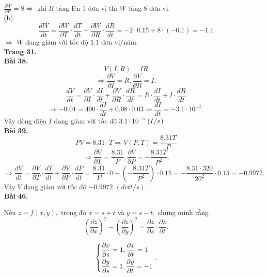 \documentclass[12pt,a4paper]{article}
\begin{document}
\(\frac{{\partial W}}{{\partial R}} = 8 \Rightarrow \) khi \(R\) tăng lên \(1\) đơn vị thì \(W\) tăng \(8\) đơn vị.\\
(b). \[\frac{{dW}}{{dt}} = \frac{{\partial W}}{{\partial T}} \cdot \frac{{dT}}{{dt}} + \frac{{\partial W}}{{\partial R}} \cdot \frac{{dR}}{{dt}} =  - 2 \cdot 0.15 + 8 \cdot \left( { - 0.1} \right) =  - 1.1\]
\( \Rightarrow \) \(W\) đang giảm với tốc độ \(1.1\) đơn vị\(/\)năm.\\
\textbf{Trang 31.}\\
\textbf{Bài 38.}
\[V\left( {I,R} \right) = IR\]
\[ \Rightarrow \frac{{\partial V}}{{\partial I}} = R,\frac{{\partial V}}{{\partial R}} = I.\]
\[\frac{{dV}}{{dt}} = \frac{{\partial V}}{{\partial I}} \cdot \frac{{dI}}{{dt}} + \frac{{\partial V}}{{\partial R}} \cdot \frac{{dR}}{{dt}} = R \cdot \frac{{dI}}{{dt}} + I \cdot \frac{{dR}}{{dt}}\]
\[ \Rightarrow  - 0.01 = 400 \cdot \frac{{dI}}{{dt}} + 0.08 \cdot 0.03 \Rightarrow \frac{{dI}}{{dt}} =  - 3.1 \cdot {10^{ - 5}}.\]
Vậy dòng điện \(I\) đang giảm với tốc độ \(3.1 \cdot {10^{ - 5}}\) \(\left( {{I \mathord{\left/
 {\vphantom {I s}} \right.
 \kern-\nulldelimiterspace} s}} \right.)\)\\
\textbf{Bài 39.} 
\[PV = 8.31 \cdot T \Rightarrow V\left( {P,T} \right) = \frac{{8.31T}}{P}\]
\[ \Rightarrow \frac{{\partial V}}{{\partial T}} = \frac{{8.31}}{P},\frac{{\partial V}}{{\partial P}} =  - \frac{{8.31T}}{{{P^2}}}.\]
\[ \Rightarrow \frac{{dV}}{{dt}} = \frac{{\partial V}}{{\partial T}} \cdot \frac{{dT}}{{dt}} + \frac{{\partial V}}{{\partial P}} \cdot \frac{{dP}}{{dt}} = \frac{{8.31}}{P} \cdot 0 + \left( { - \frac{{8.31T}}{{{P^2}}}} \right) \cdot 0.15 =  - \frac{{8.31 \cdot 320}}{{{{20}^2}}} \cdot 0.15 =  - 0.9972.\] 
Vậy \(V\) đang giảm với tốc độ \(-0.9972\) \(\left( dvtt / s \right).\)\\
\textbf{Bài 46.} 
\begin{mybox}
Nếu \(z = f\left( {x,y} \right),\) trong đó \(x = s + t\) và \(y = s - t,\) chứng minh rằng
\[{\left( {\frac{{\partial z}}{{\partial x}}} \right)^2} - {\left( {\frac{{\partial z}}{{\partial y}}} \right)^2} = \frac{{\partial z}}{{\partial s}} \cdot \frac{{\partial z}}{{\partial t}}.\]
\end{mybox}
\[\left\{ \begin{gathered}
  \frac{{\partial x}}{{\partial s}} = 1,\frac{{\partial x}}{{\partial t}} = 1 \hfill \\
  \frac{{\partial y}}{{\partial s}} = 1,\frac{{\partial y}}{{\partial t}} =  - 1 \hfill \\ 
\end{gathered}  \right..\]
\end{document}
